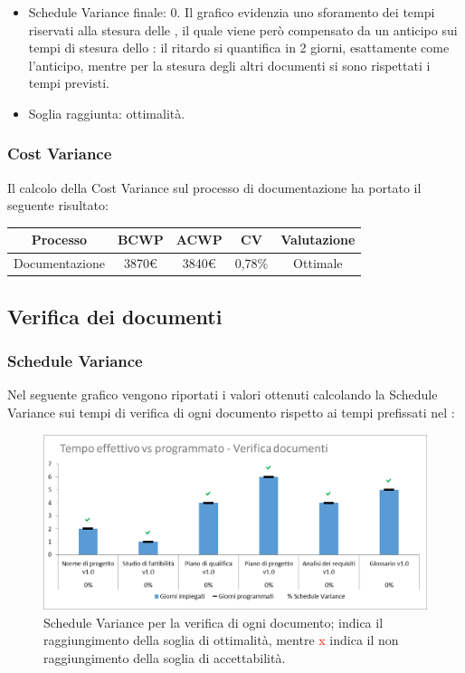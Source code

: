 \begin{itemize}
	\item Schedule Variance finale: 0. 
	Il grafico evidenzia uno sforamento dei tempi riservati alla stesura delle \NdP{}, il quale viene però compensato da un anticipo sui tempi di stesura dello \SdF{}: il ritardo si quantifica in 2 giorni, esattamente come l'anticipo, mentre per la stesura degli altri documenti si sono rispettati i tempi previsti. 
	
	\item Soglia raggiunta: ottimalità.
\end{itemize}

\subsubsection{Cost Variance}
Il calcolo della Cost Variance sul processo di documentazione ha portato il seguente risultato: 

{
\renewcommand{\arraystretch}{2}
\centering
\begin{tabular}{| c | c | c | c | c |}
	\hline
	\textbf{Processo} & \textbf{BCWP} & \textbf{ACWP} & \textbf{CV} & \textbf{Valutazione} \\
	\hline
	Documentazione & 3870\euro & 3840\euro & 0,78\% & Ottimale \\
	\hline
\end{tabular}

}


\subsection{Verifica dei documenti}
\subsubsection{Schedule Variance}
Nel seguente grafico vengono riportati i valori ottenuti calcolando la Schedule Variance sui tempi di verifica di ogni documento rispetto ai tempi prefissati nel \PdP{}:

\begin{figure}[h!]
	\centering
	\includegraphics[scale=0.75]{img/Grafici/SV-VerDocumenti.png}
	\caption{Schedule Variance per la verifica di ogni documento; \textcolor{green}{\checkmark} indica il raggiungimento della soglia di ottimalità, mentre \textcolor{red}{x} indica il non raggiungimento della soglia di accettabilità.}
	\label{fig:SV-VerDocumenti}
\end{figure}

